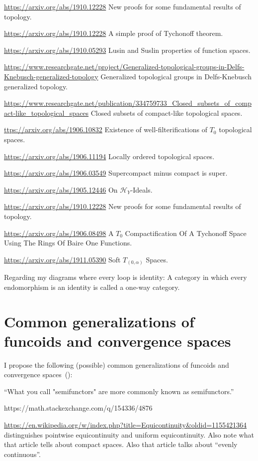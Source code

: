 \documentclass{amsart}
\begin{document}
\url{https://arxiv.org/abs/1910.12228} New proofs for some fundamental results of topology.

\url{https://arxiv.org/abs/1910.12228} A simple proof of Tychonoff theorem.

\url{https://arxiv.org/abs/1910.05293} Lusin and Suslin properties of function spaces.

\url{https://www.researchgate.net/project/Generalized-topological-groups-in-Delfs-Knebusch-generalized-topology}
Generalized topological groups in Delfs-Knebusch generalized topology.

\url{https://www.researchgate.net/publication/334759733_Closed_subsets_of_compact-like_topological_spaces}
Closed subsets of compact-like topological spaces.

\url{ttps://arxiv.org/abs/1906.10832} Existence of well-filterifications of $T_0$ topological spaces.

\url{https://arxiv.org/abs/1906.11194} Locally ordered topological spaces.

\url{https://arxiv.org/abs/1906.03549} Supercompact minus compact is super.

\url{https://arxiv.org/abs/1905.12446} On $\mathcal{H}_Y$-Ideals.

\url{https://arxiv.org/abs/1910.12228} New proofs for some fundamental results of topology.

\url{https://arxiv.org/abs/1906.08498} A $T_0$ Compactification Of A Tychonoff Space Using The Rings Of Baire One
  Functions.

\url{https://arxiv.org/abs/1911.05390} Soft $T_{(0,\alpha)}$ Spaces.

Regarding my diagrams where every loop is identity:
A category in which every endomorphism is an identity is called a one-way category.

\section{Common generalizations of funcoids and convergence spaces}

I propose the following (possible) common generalizations of funcoids and convergence spaces~(\cite{converg}):

``What you call "semifunctors" are more commonly known as semifunctors.''

https://math.stackexchange.com/q/154336/4876

\url{https://en.wikipedia.org/w/index.php?title=Equicontinuity&oldid=1155421364} distinguishes
pointwise equicontinuity and uniform equicontinuity. Also note what that article tells about compact spaces.
Also that article talks about ``evenly continuous''.
\end{document}
